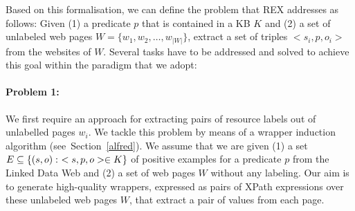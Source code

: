 Based on this formalisation, we can define the problem that REX addresses as follows: Given (1)
a predicate $p$ that is contained in a  \ac{KB} $K$ 
and (2) a set of unlabeled web pages $W = \{w_1, w_2, \ldots, w_{|W|}\}$,
extract a set of triples $<s_i, p, o_i>$ from the websites of $W$.
Several tasks have to be addressed and solved to achieve this goal within the paradigm that we adopt: %


\paragraph{Problem 1:}
We first require an approach for extracting pairs of resource labels out of unlabelled pages $w_i$. 
We tackle this problem by means of a wrapper induction algorithm (see~Section~\ref{alfred}). 
We assume that we are given (1) a set ${\examples} \subseteq \{(s,o):\ <s,p,o> \in K\}$ of positive examples for a predicate $p$ from the Linked Data Web and (2) a set of web pages $W$ without any labeling. 
Our aim is to generate high-quality wrappers, expressed as pairs of XPath expressions over these unlabeled web pages $W$, that extract a pair of values from each page.
